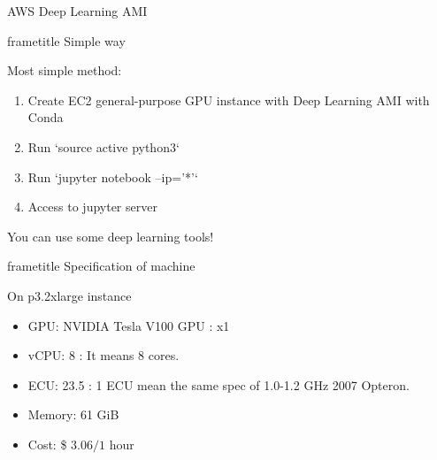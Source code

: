 \begin{frame}[plain,t]
  {AWS Deep Learning AMI}

  \begin{beamercolorbox}[rounded=true, center, shadow=true,wd=\linewidth]{frametitle}
    Simple way
  \end{beamercolorbox}
  Most simple method:

  \begin{enumerate}
    \item Create EC2 general-purpose GPU instance with Deep Learning AMI with Conda
    \item Run `source active python3`
    \item Run `jupyter notebook --ip='*'`
    \item Access to jupyter server
  \end{enumerate}

  You can use some deep learning tools!

  \begin{beamercolorbox}[rounded=true, center, shadow=true,wd=\linewidth]{frametitle}
    Specification of machine
  \end{beamercolorbox}

  On p3.2xlarge instance
  \begin{itemize}
    \item GPU: NVIDIA Tesla V100 GPU : x1
    \item vCPU: 8 : It means 8 cores.
    \item ECU: 23.5 : 1 ECU mean the same spec of 1.0-1.2 GHz 2007 Opteron.
    \item Memory: 61 GiB
    \item Cost: \$ $3.06 / 1$ hour
  \end{itemize}
\end{frame}
